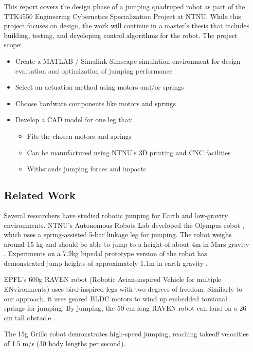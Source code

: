 This report covers the design phase of a jumping quadruped robot as part of the TTK4550 Engineering Cybernetics Specialization Project at NTNU. While this project focuses on design, the work will continue in a master's thesis that includes building, testing, and developing control algorithms for the robot.
The project scope:
\begin{itemize}
    \item Create a MATLAB / Simulink Simscape \cite{simulink_simscape} simulation environment for design evaluation and optimization of jumping performance
    \item Select an actuation method using motors and/or springs
    \item Choose hardware components like motors and springs
    \item Develop a CAD model for one leg that:
    \begin{itemize}
        \item Fits the chosen motors and springs
        \item Can be manufactured using NTNU's 3D printing and CNC facilities
        \item Withstands jumping forces and impacts
    \end{itemize}
\end{itemize}

\subsection{Related Work}
\label{sec:related_work}

Several researchers have studied robotic jumping for Earth and low-gravity environments. NTNU's Autonomous Robots Lab developed the Olympus robot \cite{OLYMPUS1} \cite{OLYMPUS2}, which uses a spring-assisted 5-bar linkage leg for jumping. The robot weighs around 15 kg and should be able to jump to a height of about 4m in Mars gravity \cite{OLYMPUS2}. Experiments on a 7.9kg bipedal prototype version of the robot has demonstrated jump heights of approximately 1.1m in earth gravity \cite{OLYMPUS1}. 

EPFL's 600g RAVEN robot (Robotic Avian-inspired Vehicle for multiple ENvironments) \cite{RAVEN} uses bird-inspired legs with two degrees of freedom. Similarly to our approach, it uses geared BLDC motors to wind up embedded torsional springs for jumping. By jumping, the 50 cm long RAVEN robot can land on a 26 cm tall obstacle \cite{RAVEN}. 

The 15g Grillo robot \cite{GRILLO} demonstrates high-speed jumping, reaching takeoff velocities of 1.5 m/s (30 body lengths per second).